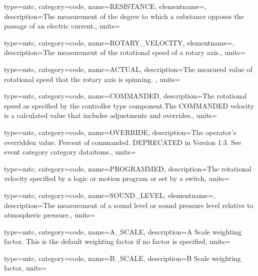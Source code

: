 {
  type=mtc,
  category=code,
  name={RESISTANCE},
  elementname=,
  description={The measurement of the degree to which a substance opposes the passage of an electric current.},
  units=
}

{
  type=mtc,
  category=code,
  name={ROTARY\_VELOCITY},
  elementname=,
  description={The measurement of the rotational speed of a rotary axis.},
  units=
}

{
  type=mtc,
  category=code,
  name={ACTUAL},
  description={The measured value of rotational speed that the rotary axis is spinning. },
  units=
}

{
  type=mtc,
  category=code,
  name={COMMANDED},
  description={The rotational speed as specified by the \gls{controller} type component.The COMMANDED velocity is a calculated value that includes adjustments and overrides.},
  units=
}

{
  type=mtc,
  category=code,
  name={OVERRIDE},
  description={The operator’s overridden value.  Percent of commanded. DEPRECATED in Version 1.3.   See \gls{event category} category \glspl{dataitem}.},
  units=
}

{
  type=mtc,
  category=code,
  name={PROGRAMMED},
  description={The rotational velocity specified by a logic or motion program or set by a switch},
  units=
}

{
  type=mtc,
  category=code,
  name={SOUND\_LEVEL},
  elementname=,
  description={The measurement of a sound level or sound pressure level relative to atmospheric pressure.},
  units=
}

{
  type=mtc,
  category=code,
  name={A\_SCALE},
  description={A Scale weighting factor.   This is the default weighting factor if no factor is specified},
  units=
}

{
  type=mtc,
  category=code,
  name={B\_SCALE},
  description={B Scale weighting factor},
  units=
}

